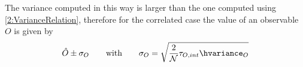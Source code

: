 The variance computed in this way is larger than the one computed using \eqref{2:VarianceRelation}, therefore for the correlated case the value of an observable $O$ is given by
\begin{equation}
    \hat{O}\pm\sigma_O \qquad\text{with}\qquad \sigma_O = \sqrt{\frac{2}{\mathcal{N}}\tau_{O,int}\hvariance_O} \label{2:FinalMeasureCorr}
\end{equation}
